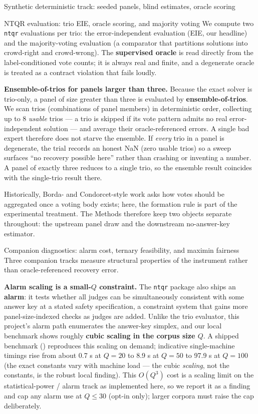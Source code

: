 \documentclass[
  ignorenonframetext,
]{beamer}
\begin{document}
\begin{frame}{Synthetic deterministic track:
seeded panels, blind estimates, oracle scoring}
\begin{block}{NTQR evaluation: trio EIE, oracle scoring, and majority
voting}
We compute two \texttt{ntqr} evaluations per trio: the error-independent
evaluation (EIE, our headline) and the majority-voting evaluation (a
comparator that partitions solutions into crowd-right and crowd-wrong).
The \textbf{supervised oracle} is read directly from the
label-conditioned vote counts; it is always real and finite, and a
degenerate oracle is treated as a contract violation that fails loudly.

\textbf{Ensemble-of-trios for panels larger than three.} Because the
exact solver is trio-only, a panel of size greater than three is
evaluated by \textbf{ensemble-of-trios}. We scan trios (combinations of
panel members) in deterministic order, collecting up to 8 \emph{usable}
trios --- a trio is skipped if its vote pattern admits no real
error-independent solution --- and average their oracle-referenced
errors. A single bad expert therefore does not starve the ensemble. If
\emph{every} trio in a panel is degenerate, the trial records an honest
NaN (zero usable trios) so a sweep surfaces ``no recovery possible
here'' rather than crashing or inventing a number. A panel of exactly
three reduces to a single trio, so the ensemble result coincides with
the single-trio result there.

Historically, Borda- and Condorcet-style work asks how votes should be
aggregated once a voting body exists; here, the formation rule is part
of the experimental treatment. The Methods therefore keep two objects
separate throughout: the upstream panel draw and the downstream
no-answer-key estimator.
\end{block}

\begin{block}{Companion diagnostics: alarm cost, ternary feasibility,
and maximin fairness}
\protect{}\label{companion-diagnostics-alarm-cost-ternary-feasibility-and-maximin-fairness}
Three companion tracks measure structural properties of the instrument
rather than oracle-referenced recovery error.

\textbf{Alarm scaling is a small-\(Q\) constraint.} The \texttt{ntqr}
package also ships an \textbf{alarm}: it tests whether all judges can be
simultaneously consistent with some answer key at a stated safety
specification, a constraint system that gains more panel-size-indexed
checks as judges are added. Unlike the trio evaluator, this project's
alarm path enumerates the answer-key simplex, and our local benchmark
shows roughly \textbf{cubic scaling in the corpus size \(Q\)}. A shipped
benchmark () reproduces this scaling on
demand; indicative single-machine timings rise from about 0.7 s at
\(Q=20\) to 8.9 s at \(Q=50\) to 97.9 s at \(Q=100\) (the exact
constants vary with machine load --- the cubic \emph{scaling}, not the
constants, is the robust local finding). This \(O(Q^3)\) cost is a
scaling limit on the statistical-power / alarm track as implemented
here, so we report it as a finding and cap any alarm use at \(Q\leq30\)
(opt-in only); larger corpora must raise the cap deliberately.


\end{block}
\end{frame}
\end{document}
